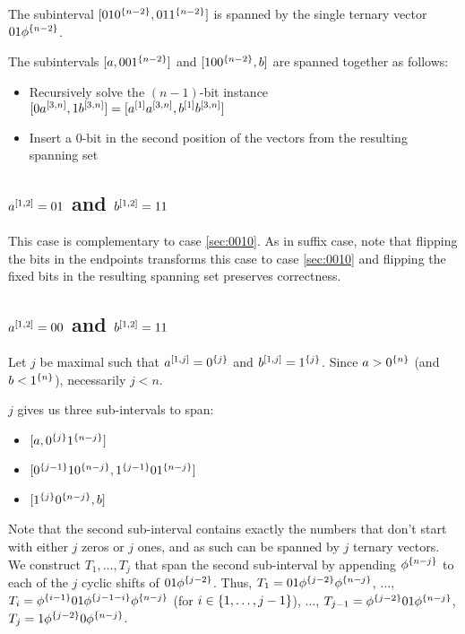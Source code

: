 The subinterval
$[01 0^{\{n-2\}}, 01 1^{\{n-2\}}]$
is spanned by the single ternary vector
$01 \phi^{\{n-2\}}$.

The subintervals
$[a, 00 1^{\{n-2\}}]$
and
$[10 0^{\{n-2\}}, b]$
are spanned together as follows:

\begin{itemize}
\item Recursively solve the $(n-1)$-bit instance
$[0 a^{[3, n]}, 1 b^{[3, n]}]
= [a^{[1]} a^{[3, n]}, b^{[1]} b^{[3, n]}]$
\item Insert a $0$-bit in the second position
of the vectors from the resulting spanning set
\end{itemize}

\subsection{\texorpdfstring
{$a^{[1, 2]} = 01$ and $b^{[1, 2]} = 11$}
{a[1,2] = 01 and b[1,2] = 11}
}

This case is complementary to case \ref{sec:0010}.
As in suffix case,
note that flipping the bits in the endpoints
transforms this case to case \ref{sec:0010}
and flipping the fixed bits in the resulting spanning set
preserves correctness.

\subsection{\texorpdfstring
{$a^{[1, 2]} = 00$ and $b^{[1, 2]} = 11$}
{a[1,2] = 00 and b[1,2] = 11}
}

Let $j$ be maximal such that
$a^{[1, j]} = 0^{\{j\}}$ and
$b^{[1, j]} = 1^{\{j\}}$.
Since $a > 0^{\{n\}}$ (and $b < 1^{\{n\}}$),
necessarily $j < n$.

$j$ gives us three sub-intervals to span:

\begin{itemize}
\item $[a, 0^{\{j\}} 1^{\{n-j\}}]$
\item $[0^{\{j-1\}} 1 0^{\{n-j\}}, 1^{\{j-1\}} 0 1^{\{n-j\}}]$
\item $[1^{\{j\}} 0^{\{n-j\}}, b]$
\end{itemize}

Note that the second sub-interval contains exactly
the numbers that don't start with either $j$ zeros
or $j$ ones,
and as such can be spanned by $j$ ternary vectors.
We construct $T_1, \ldots, T_j$ that span
the second sub-interval
by appending $\phi^{\{n-j\}}$
to each of the $j$ cyclic shifts of $01 \phi^{\{j-2\}}$.
Thus,
$T_1 = 01 \phi^{\{j-2\}} \phi^{\{n-j\}}$,
$\ldots$,
$T_i = \phi^{\{i-1\}} 01 \phi^{\{j-1-i\}} \phi^{\{n-j\}}$
(for $i \in \{1, \ldots, j-1\}$),
$\ldots$,
$T_{j-1} = \phi^{\{j-2\}} 01 \phi^{\{n-j\}}$,
$T_j = 1 \phi^{\{j-2\}} 0 \phi^{\{n-j\}}$.

